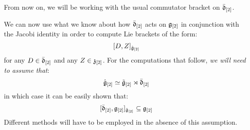             \begin{convention}
                From now on, we will be working with the usual commutator bracket on $\bar{\mathfrak{d}}_{[2]}$. 
            \end{convention}
            
            \begin{remark} \label{remark: derivation_action_on_toroidal_centres}
                We can now use what we know about how $\bar{\mathfrak{d}}_{[2]}$ acts on $\mathfrak{g}_{[2]}$ in conjunction with the Jacobi identity in order to compute Lie brackets of the form:
                    $$[D, Z]_{\hat{\mathfrak{g}}_{[2]}}$$
                for any $D \in \bar{\mathfrak{d}}_{[2]}$ and any $Z \in \mathfrak{z}_{[2]}$. For the computations that follow, \textit{we will need to assume that}:
                    $$\hat{\mathfrak{g}}_{[2]} \simeq \tilde{\mathfrak{g}}_{[2]}\rtimes \bar{\mathfrak{d}}_{[2]}$$
                in which case it can be easily shown that:
                    $$[\bar{\mathfrak{d}}_{[2]}, \mathfrak{g}_{[2]}]_{\hat{\mathfrak{g}}_{[2]}} \subseteq \mathfrak{g}_{[2]}$$
                Different methods will have to be employed in the absence of this assumption.


\end{remark}
